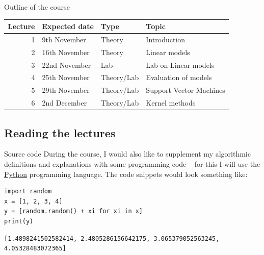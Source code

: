 \documentclass[10pt]{beamer}
\begin{document}
\begin{frame}[label={sec:org3e1bbdd}]{Outline of the course}
\begin{center}
\begin{tabular}{rlll}
\toprule
Lecture & Expected date & Type & Topic\\
\midrule
1 & 9th November & Theory & Introduction\\
2 & 16th November & Theory & Linear models\\
3 & 22nd November & Lab & Lab on Linear models\\
4 & 25th November & Theory/Lab & Evaluation of models\\
5 & 29th November & Theory/Lab & Support Vector Machines\\
6 & 2nd December & Theory/Lab & Kernel methods\\
\bottomrule
\end{tabular}
\end{center}
\end{frame}

\subsection*{Reading the lectures}
\label{sec:org7d7c318}

\begin{frame}[label={sec:org7a9f785},fragile]{Source code}
 During the course, I would also like to supplement my algorithmic definitions and
explanations with some programming code -- for this I will use the \href{https://www.python.org/}{Python} programming
language. The code snippets would look something like:

\begin{verbatim}
import random
x = [1, 2, 3, 4]
y = [random.random() + xi for xi in x]
print(y)
\end{verbatim}

\begin{verbatim}
[1.4898241502582414, 2.4805286156642175, 3.065379052563245, 4.05328483072365]
\end{verbatim}
\end{frame}
\end{document}
